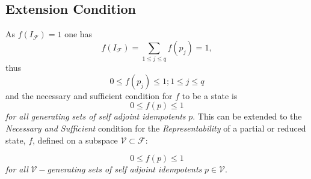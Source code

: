 \documentclass[aps,preprint]{revtex4}%
\begin{document}
\subsection{Extension Condition}

As $f\left(  I_{\mathcal{F}}\right)  =1$ one has
\begin{equation}
f\left(  I_{\mathcal{F}}\right)  =\sum_{1\leq j\leq q}f\left(  p_{j}\right)
=1,
\end{equation}
thus
\begin{equation}
0\leq f\left(  p_{j}\right)  \leq1;1\leq j\leq q
\end{equation}
and the necessary and sufficient condition for $f$ to be a state is
\begin{equation}
0\leq f\left(  p\right)  \leq1
\end{equation}
\emph{for all generating sets of self adjoint idempotents }$p.$ This can be
extended to the \emph{Necessary and Sufficient} condition for the
\emph{Representability} of a partial or reduced state, $f$, defined on a
subspace $\mathcal{V\subset F}$:%

\begin{equation}
0\leq f\left(  p\right)  \leq1
\end{equation}
\emph{for all }$\mathcal{V-}$\emph{generating sets of self adjoint idempotents
}$p\in\mathcal{V}.$
\end{document}
